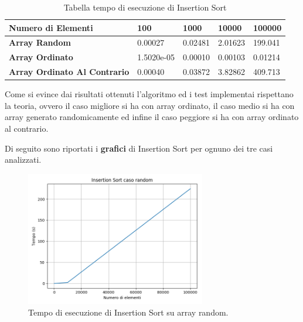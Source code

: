 \documentclass[a4paper]{article}
\begin{document}
\begin{center}
\begin{table}[h!]
\centering
\begin{tabular}{|l|l|l|l|l|}

\hline
\textbf{Numero di Elementi} & \textbf{100} & \textbf{1000} & \textbf{10000} & \textbf{100000}\\
\hline
\textbf{Array Random} & 0.00027 & 0.02481 & 2.01623 & 199.041\\
\hline
\textbf{Array Ordinato} & 1.5020e-05 & 0.00010 & 0.00103 & 0.01214   \\
\hline
\textbf{Array Ordinato Al Contrario} & 0.00040 & 0.03872 & 3.82862 & 409.713  \\
\hline
\end{tabular}
\caption{Tabella tempo di esecuzione di Insertion Sort}
\end{table}
\end{center}

Come si evince dai risultati ottenuti l'algoritmo ed i test implementai rispettano la teoria, ovvero il caso migliore si ha con array ordinato, il caso medio si ha con array generato randomicamente ed infine il caso peggiore si ha con array ordinato al contrario.

Di seguito sono riportati i \textbf{grafici} di Insertion Sort per ognuno dei tre casi analizzati.

\begin{figure}[h]
    \centering
    \captionsetup{justification=centering,margin=1.0cm}
    \includegraphics[width=0.7\textwidth]{IS_random}
    \caption{Tempo di esecuzione di Insertion Sort su array random.}
    \label{fig:test2_1}
\end{figure}
\end{document}
